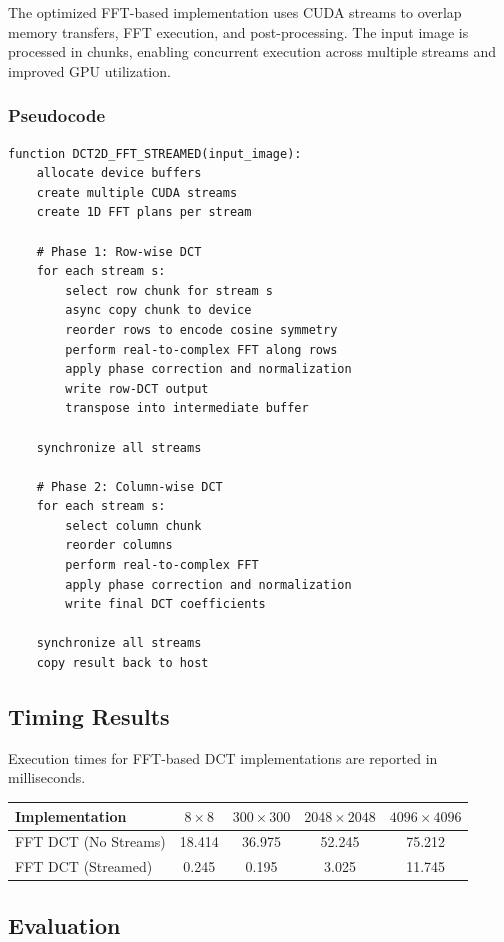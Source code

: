 \documentclass{article}
\begin{document}
The optimized FFT-based implementation uses CUDA streams to overlap memory transfers, FFT execution, and post-processing. The input image is processed in chunks, enabling concurrent execution across multiple streams and improved GPU utilization.

\subsubsection{Pseudocode}

\begin{verbatim}
function DCT2D_FFT_STREAMED(input_image):
    allocate device buffers
    create multiple CUDA streams
    create 1D FFT plans per stream

    # Phase 1: Row-wise DCT
    for each stream s:
        select row chunk for stream s
        async copy chunk to device
        reorder rows to encode cosine symmetry
        perform real-to-complex FFT along rows
        apply phase correction and normalization
        write row-DCT output
        transpose into intermediate buffer

    synchronize all streams

    # Phase 2: Column-wise DCT
    for each stream s:
        select column chunk
        reorder columns
        perform real-to-complex FFT
        apply phase correction and normalization
        write final DCT coefficients

    synchronize all streams
    copy result back to host
\end{verbatim}

\subsection{Timing Results}

Execution times for FFT-based DCT implementations are reported in milliseconds.

\begin{center}
\begin{tabular}{lcccc}
\toprule
Implementation & $8\times8$ & $300\times300$ & $2048\times2048$ & $4096\times4096$ \\
\midrule
FFT DCT (No Streams) & 18.414 & 36.975 & 52.245 & 75.212 \\
FFT DCT (Streamed) & 0.245 & 0.195 & 3.025 & 11.745 \\
\bottomrule
\end{tabular}
\end{center}

\subsection{Evaluation}
\end{document}
